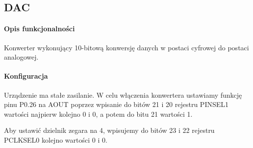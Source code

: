 \subsection{DAC}
    
\paragraph{Opis funkcjonalności}

    Konwerter wykonujący 10-bitową konwersję danych w postaci cyfrowej
    do postaci analogowej.

\paragraph{Konfiguracja}

    Urządzenie ma stałe zasilanie. W celu włączenia konwertera ustawiamy
    funkcję pinu P0.26 na AOUT poprzez wpisanie do bitów 21 i 20
    rejestru PINSEL1 wartości najpierw kolejno 0 i 0, a potem do bitu
    21 wartości 1.

    Aby ustawić dzielnik zegara na 4, wpisujemy do bitów 23 i 22
    rejestru PCLKSEL0 kolejno wartości 0 i 0.
